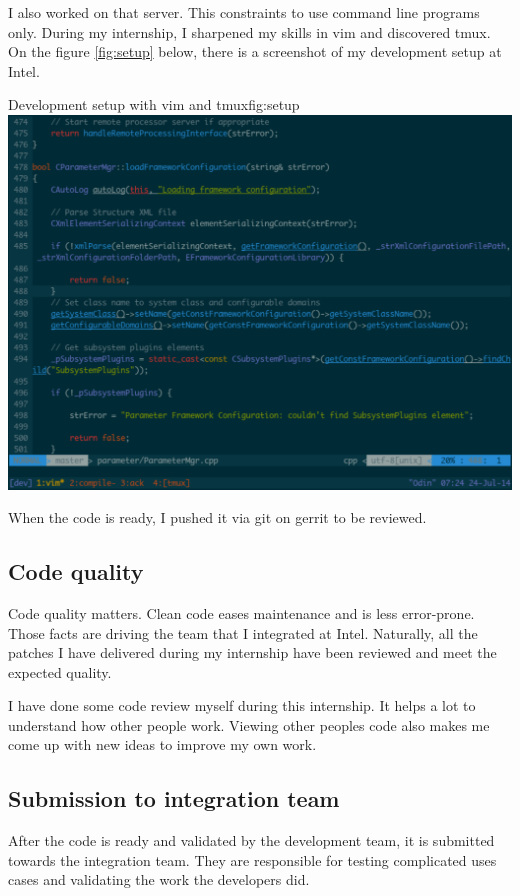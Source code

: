 I also worked on that server. This constraints to use command line programs only.
During my internship, I sharpened my skills in \gls{vim} and discovered \gls{tmux}.
On the figure \ref{fig:setup} below, there is a screenshot of my development setup at Intel.

\begin{figureGraphics}{Development setup with vim and tmux}{fig:setup}
\includegraphics[width=\textwidth]{./src/img/setup.pdf}
\end{figureGraphics}

When the code is ready, I pushed it via \gls{git} on \gls{gerrit} to be reviewed.

\subsection{Code quality}
Code quality matters. Clean code eases maintenance and is less error-prone.
Those facts are driving the team that I integrated at Intel. Naturally, all the
patches I have delivered during my internship have been reviewed and meet the
expected quality.

I have done some code review myself during this internship. It helps a lot to
understand how other people work. Viewing other peoples code also makes me come
up with new ideas to improve my own work.

\subsection{Submission to integration team}
After the code is ready and validated by the development team, it is submitted towards the integration team.
They are responsible for testing complicated uses cases and validating the work the developers did.

